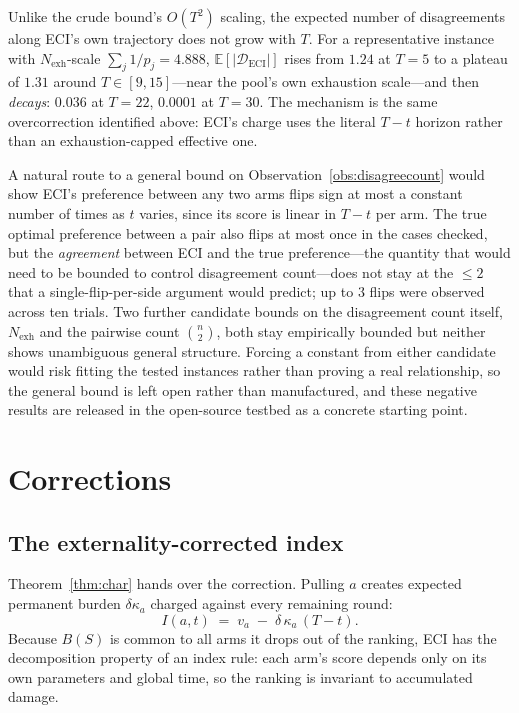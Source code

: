 \begin{observation}
\label{obs:disagreecount}
Unlike the crude bound's $O(T^2)$ scaling, the expected number of
disagreements along ECI's own trajectory does not grow with $T$. For a
representative instance with $N_{\mathrm{exh}}$-scale $\sum_j 1/p_j = 4.888$,
$\mathbb{E}[|\mathcal{D}_{\mathrm{ECI}}|]$ rises from $1.24$ at $T=5$ to a
plateau of $1.31$ around $T\in[9,15]$---near the pool's own exhaustion
scale---and then \emph{decays}: $0.036$ at $T=22$, $0.0001$ at $T=30$. The
mechanism is the same overcorrection identified above: ECI's charge uses the
literal $T-t$ horizon rather than an exhaustion-capped effective one.
\end{observation}

\begin{remark}
\label{rem:openflip}
A natural route to a general bound on Observation~\ref{obs:disagreecount}
would show ECI's preference between any two arms flips sign at most a
constant number of times as $t$ varies, since its score is linear in $T-t$
per arm. The true optimal preference between a pair also
flips at most once in the cases checked, but the \emph{agreement} between
ECI and the true preference---the quantity that would need to be bounded to
control disagreement count---does not stay at the $\le\!2$ that a
single-flip-per-side argument would predict; up to $3$ flips were observed
across ten trials. Two further candidate bounds on the disagreement count
itself, $N_{\mathrm{exh}}$ and the pairwise count $\binom{n}{2}$, both stay
empirically bounded but neither shows unambiguous general structure.
Forcing a constant from either candidate would risk fitting the tested
instances rather than proving a real relationship, so the general bound is
left open rather than manufactured, and these negative results are released
in the open-source testbed as a concrete starting point.
\end{remark}

\section{Corrections}

\subsection{The externality-corrected index}
\label{sec:eci}

Theorem~\ref{thm:char} hands over the correction. Pulling $a$ creates expected
permanent burden $\delta\kappa_a$ charged against every remaining round:
\[
I(a,t) \;=\; v_a \;-\; \delta\,\kappa_a\,(T-t).
\]
Because $B(S)$ is common to all arms it drops out of the ranking, ECI has the
decomposition property of an index rule: each arm's score depends only on its own
parameters and global time, so the ranking is invariant to accumulated damage.

